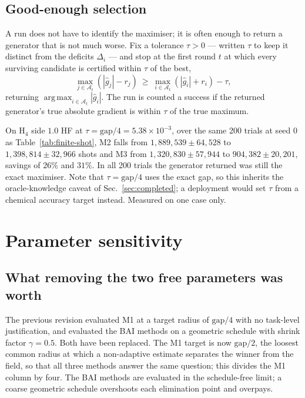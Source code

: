 \documentclass[10pt]{article}
\newcommand{\argmax}{\operatorname*{arg\,max}}
\begin{document}
\subsection{Good-enough selection}
\label{sec:good-enough}

A run does not have to identify the maximiser; it is often enough to return a
generator that is not much worse. Fix a tolerance $\tau>0$ --- written $\tau$ to
keep it distinct from the deficits $\Delta_i$ --- and stop at the first round $t$
at which every surviving candidate is certified within $\tau$ of the best,
\begin{equation}
  \max_{j\in\mathcal A_t}\left(|\widehat g_j|-r_j\right)
  \ \ge\
  \max_{i\in\mathcal A_t}\left(|\widehat g_i|+r_i\right)-\tau ,
  \label{eq:good-enough}
\end{equation}
returning $\argmax_{i\in\mathcal A_t}|\widehat g_i|$. The run is counted a success
if the returned generator's true absolute gradient is within $\tau$ of the true
maximum.

On H$_4$ side $1.0$ HF at $\tau=\mathrm{gap}/4=5.38\times10^{-3}$, over the same
200 trials at seed $0$ as Table~\ref{tab:finite-shot}, M2 falls from
$1{,}889{,}539\pm64{,}528$ to $1{,}398{,}814\pm32{,}966$ shots and M3 from
$1{,}320{,}830\pm57{,}944$ to $904{,}382\pm20{,}201$, savings of $26\%$ and $31\%$.
In all 200 trials the generator returned was still the exact maximiser. Note that
$\tau=\mathrm{gap}/4$ uses the exact gap, so this inherits the oracle-knowledge
caveat of Sec.~\ref{sec:completed}; a deployment would set $\tau$ from a chemical
accuracy target instead. Measured on one case only.

\section{Parameter sensitivity}
\label{sec:sensitivity}

\subsection{What removing the two free parameters was worth}

The previous revision evaluated M1 at a target radius of $\mathrm{gap}/4$ with no
task-level justification, and evaluated the BAI methods on a geometric schedule
with shrink factor $\gamma=0.5$. Both have been replaced. The M1 target is now
$\mathrm{gap}/2$, the loosest common radius at which a non-adaptive estimate
separates the winner from the field, so that all three methods answer the same
question; this divides the M1 column by four. The BAI methods are evaluated in the
schedule-free limit; a coarse geometric schedule overshoots each elimination point
and overpays.
\end{document}
